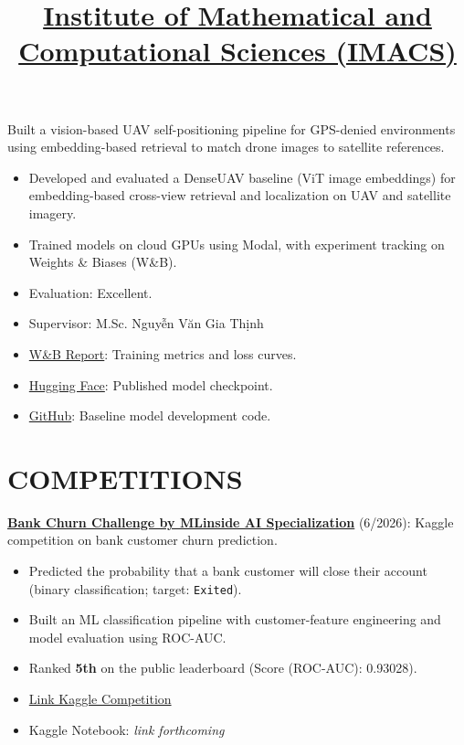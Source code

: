 \documentclass[margin]{res}
\begin{document}
\begin{resume}
  \title{\href{http://imacs.hcmut.edu.vn}{\textbf{Institute of Mathematical and Computational Sciences (IMACS)}}}
  \begin{position}
    Built a vision-based UAV self-positioning pipeline for GPS-denied environments using embedding-based retrieval to match drone images to satellite references.
    \begin{itemize}
      \item Developed and evaluated a DenseUAV baseline (ViT image embeddings) for embedding-based cross-view retrieval and localization on UAV and satellite imagery.
      \item Trained models on cloud GPUs using Modal, with experiment tracking on Weights \& Biases (W\&B).
      \item Evaluation: Excellent.
      \item Supervisor: M.Sc. Nguyễn Văn Gia Thịnh
      \item \href{https://wandb.ai/chibangn1-https-bancie-github-io-tilearn-/denseuav-baseline/reports/DenseUAV-Non-GPS-Training-Performance--VmlldzoxNjE5NDMwOQ?accessToken=hl4axuavbu3up6rygu5oy7r3ru3jiwwlg285ax59kdhonfcqgx2n0nhmwex4rfob}{W\&B Report}: Training metrics and loss curves.
      \item \href{https://huggingface.co/Bancie/UAV-Self-Positioning-23M-ZCN}{Hugging Face}: Published model checkpoint.
      \item \href{https://github.com/Bancie/denseUAV_baseline}{GitHub}: Baseline model development code.
    \end{itemize}
  \end{position}

\section{COMPETITIONS}
\par
\href{https://www.kaggle.com/competitions/bank-churn-competition-by-m-linside-ai-specialization}{\textbf{Bank Churn Challenge by MLinside AI Specialization}} (6/2026): Kaggle competition on bank customer churn prediction.
\begin{itemize}
  \item Predicted the probability that a bank customer will close their account (binary classification; target: \texttt{Exited}).
  \item Built an ML classification pipeline with customer-feature engineering and model evaluation using ROC-AUC.
  \item Ranked \textbf{5th} on the public leaderboard (Score (ROC-AUC): 0.93028).
  \item \href{https://www.kaggle.com/competitions/bank-churn-competition-by-m-linside-ai-specialization}{Link Kaggle Competition}
  \item Kaggle Notebook: \textit{link forthcoming} %
\end{itemize}


\end{resume}
\end{document}
